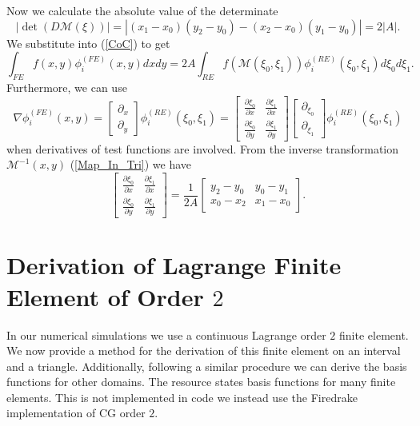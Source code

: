 \documentclass[12pt]{ociamthesis}
\begin{document}
Now we calculate the absolute value of the determinate 
\begin{equation}
|\det(D\mathcal{M}(\xi))| = |(x_1-x_0)(y_2-y_0)-(x_2-x_0)(y_1-y_0)| = 2|A|.
\end{equation}
We substitute into (\ref{CoC}) to get
\begin{equation}
\int_{FE}f(x,y)\phi_i^{(FE)}(x,y)dxdy =
2A\int_{RE}f(\mathcal{M}(\xi_0,\xi_1)) \phi_i^{(RE)}(\xi_0,\xi_1)d\xi_0d\xi_1.
\end{equation}
Furthermore, we can use
\begin{equation}
\nabla \phi_i^{(FE)}(x,y) = 
\left [
\begin{matrix}
\partial_x \\
\partial_y
\end{matrix}
\right]
\phi_i^{(RE)}(\xi_0, \xi_1) =
\left[
\begin{matrix}
\frac{\partial \xi_0}{\partial x} & 
\frac{\partial \xi_1}{\partial x} \\
\frac{\partial \xi_0}{\partial y} &
\frac{\partial \xi_1}{\partial y}
\end{matrix}
\right] 
\left [
\begin{matrix}
\partial_{\xi_0} \\
\partial_{\xi_1}
\end{matrix}
\right ]
\phi_i^{(RE)}(\xi_0, \xi_1)
\end{equation}
when derivatives of test functions are involved. From the inverse transformation $\mathcal{M}^{-1}(x, y)$ (\ref{Map_In_Tri}) we have
\begin{equation}
\left[
\begin{matrix}
\frac{\partial \xi_0}{\partial x} & 
\frac{\partial \xi_1}{\partial x} \\
\frac{\partial \xi_0}{\partial y} &
\frac{\partial \xi_1}{\partial y}
\end{matrix}
\right] = \frac{1}{2A}
\left[
\begin{matrix}
y_2-y_0 & y_0-y_1 \\
x_0-x_2 & x_1-x_0 
\end{matrix}
\right].
\end{equation}

\section{Derivation of Lagrange Finite Element of Order $2$}
In our numerical simulations we use a continuous Lagrange order $2$ finite element. We now provide a method for the derivation of this finite element on an interval and a triangle. Additionally, following a similar procedure we can derive the basis functions for other domains. The resource \cite{defelement} states basis functions for many finite elements. This is not implemented in code we instead use the Firedrake implementation of CG order $2$. 
\end{document}
